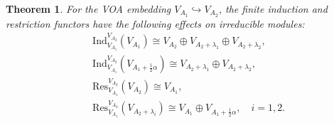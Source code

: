 \documentclass[12pt,a4paper,reqno]{amsart}
\numberwithin{equation}{section}
\numberwithin{equation}{section}
\newtheorem{thm}{Theorem}[section]
\theoremstyle{definition}
\def\la{\lambda}
\def \al{\alpha}
\def\hr{\hookrightarrow}
\def \op {\oplus}
\def\Ind{\mathrm{Ind}}
\def\Res{\mathrm{Res}}
\def\Ind{\mathrm{Ind}}
\begin{document}
	\begin{thm}\label{thm:indA1A2}
		For the VOA embedding $V_{A_1}\hr V_{A_2}$, the finite induction and restriction functors have the following effects on irreducible modules: 
		\begin{align}
			&	\Ind^{V_{A_2}}_{V_{A_1}}(V_{A_1})\cong V_{A_2}\op V_{A_2+\la_1}\op V_{A_2+\la_2},\label{eq:A1A2ind1}\\
			&	\Ind^{V_{A_2}}_{V_{A_1}}(V_{A_1+\frac{1}{2}\al})\cong V_{A_2+\la_1}\op V_{A_2+\la_2}, \label{eq:A1A2ind2}\\
			&	\Res^{V_{A_2}}_{V_{A_1}}(V_{A_2})\cong V_{A_1},\label{eq:A1A2res1}\\
			&	\Res^{V_{A_2}}_{V_{A_1}}(V_{A_2+\la_i})\cong V_{A_1}\op V_{A_1+\frac{1}{2}\al},\quad i=1,2. \label{eq:A1A2res2}
		\end{align}
	\end{thm}
\end{document}
